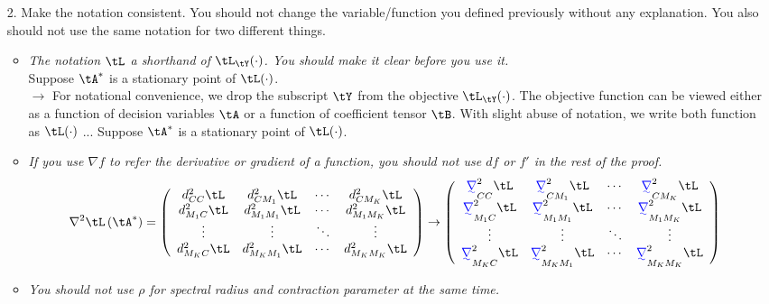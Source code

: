 \documentclass[11pt]{article}
\providecommand{\DIFaddtex}[1]{{\protect\color{blue}\uwave{#1}}} %
\providecommand{\DIFadd}[1]{{\DIFaddtex{#1}}} %
\begin{document}
\begin{enumerate}
    \item[2.] Make the notation consistent. You should not change the variable/function you defined previously without any explanation. You also should not use the same notation for two different things.
    \begin{itemize}
        \item \textit{ The notation $\tL$ a shorthand of $\tL_{\tY}(\cdot)$. You should make it clear before you use it.}\\Suppose $\tA^*$ is a stationary point of $\tL(\cdot)$.\\ 
        $\rightarrow$ For notational convenience, we drop the subscript $\tY$ from the objective $\tL_{\tY}(\cdot)$. The objective function can be viewed either as a function of decision variables $\tA$ or a function of coefficient tensor $\tB$. With slight abuse of notation, we write both function as $\tL(\cdot)$ ... Suppose  $\tA^*$ is a stationary point of $\tL(\cdot)$.
        \item \textit{If you use $\nabla f$ to refer the derivative or gradient of a function, you should not use $df$ or $f'$ in the rest of the proof.}
        \begin{align*}
        \nabla^2 \tL\left(\tA^* \right) =\left(\begin{array}{cccc} d_{CC}^{2} \tL &d_{CM_1}^{2} \tL  & \cdots & d_{CM_K}^{2} \tL \\ d_{M_1C}^{2} \tL  &d_{M_1 M_1}^{2} \tL & \cdots &  d_{M_1 M_K}^{2} \tL\\ \vdots & \vdots & \ddots & \vdots \\d_{M_KC}^{2} \tL& d_{M_K M_1}^{2} \tL & \cdots & d_{M_K M_K}^{2} \tL \end{array}\right) \rightarrow
    \left(\begin{array}{cccc} \DIFadd{\nabla}_{CC}^{2} \tL &\DIFadd{\nabla}_{CM_1}^{2} \tL  & \cdots & \DIFadd{\nabla}_{CM_K}^{2} \tL \\ \DIFadd{\nabla}_{M_1C}^{2} \tL  &\DIFadd{\nabla}_{M_1 M_1}^{2} \tL & \cdots &  \DIFadd{\nabla}_{M_1 M_K}^{2} \tL\\ \vdots & \vdots & \ddots & \vdots \\\DIFadd{\nabla}_{M_KC}^{2} \tL& \DIFadd{\nabla}_{M_K M_1}^{2} \tL & \cdots & \DIFadd{\nabla}_{M_K M_K}^{2} \tL \end{array}\right)
\end{align*}
\item \textit{You should not use $\rho$ for spectral radius and contraction parameter at the same time.}\\

\end{itemize}
\end{enumerate}
\end{document}
